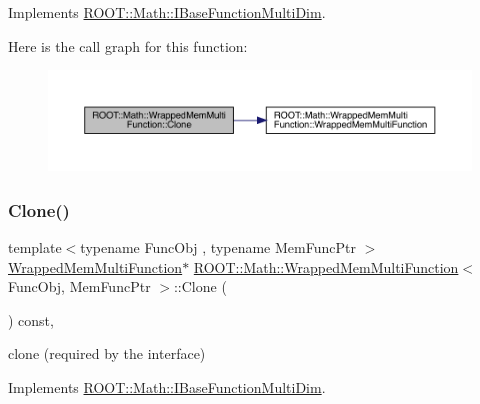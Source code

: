 Implements \mbox{\hyperlink{classROOT_1_1Math_1_1IBaseFunctionMultiDim_a57939204b1f525b43835b42e0635dd3b}{R\+O\+O\+T\+::\+Math\+::\+I\+Base\+Function\+Multi\+Dim}}.

Here is the call graph for this function\+:
\nopagebreak
\begin{figure}[H]
\begin{center}
\leavevmode
\includegraphics[width=350pt]{d3/dd9/classROOT_1_1Math_1_1WrappedMemMultiFunction_ab9f49fc9a151e8d921dbe9cb148c1fc8_cgraph}
\end{center}
\end{figure}
\mbox{\label{classROOT_1_1Math_1_1WrappedMemMultiFunction_ab9f49fc9a151e8d921dbe9cb148c1fc8}} 
\subsubsection{\texorpdfstring{Clone()}{Clone()}\hspace{0.1cm}{\footnotesize\ttfamily [3/3]}}
{\footnotesize\ttfamily template$<$typename Func\+Obj , typename Mem\+Func\+Ptr $>$ \\
\mbox{\hyperlink{classROOT_1_1Math_1_1WrappedMemMultiFunction}{Wrapped\+Mem\+Multi\+Function}}$\ast$ \mbox{\hyperlink{classROOT_1_1Math_1_1WrappedMemMultiFunction}{R\+O\+O\+T\+::\+Math\+::\+Wrapped\+Mem\+Multi\+Function}}$<$ Func\+Obj, Mem\+Func\+Ptr $>$\+::Clone (\begin{DoxyParamCaption}{ }\end{DoxyParamCaption}) const\hspace{0.3cm}{\ttfamily [inline]}, {\ttfamily [virtual]}}



clone (required by the interface) 



Implements \mbox{\hyperlink{classROOT_1_1Math_1_1IBaseFunctionMultiDim_a57939204b1f525b43835b42e0635dd3b}{R\+O\+O\+T\+::\+Math\+::\+I\+Base\+Function\+Multi\+Dim}}.

